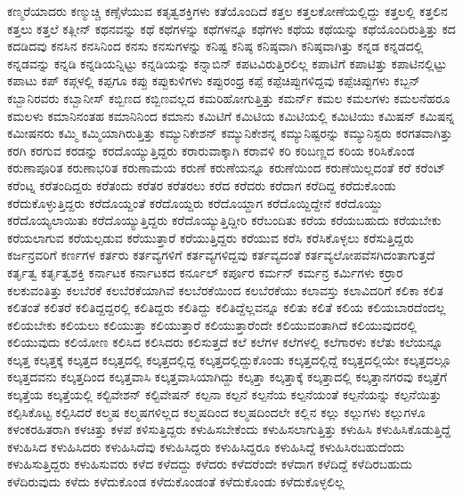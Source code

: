 {ಕಣ್ಮರೆಯಾದರು
ಕಣ್ಮುಚ್ಚಿ
ಕಣ್ಸೆಳೆಯುವ
ಕತೃತ್ವಶಕ್ತಿಗಳು
ಕತೆಯೊಂದಿದೆ
ಕತ್ತಲ
ಕತ್ತಲಕೋಣೆಯಲ್ಲಿದ್ದು
ಕತ್ತಲಲ್ಲಿ
ಕತ್ತಲಿನ
ಕತ್ತಲು
ಕತ್ತಲೆ
ಕತ್ಲೀನ್
ಕಥನವನ್ನು
ಕಥೆ
ಕಥೆಗಳನ್ನು
ಕಥೆಗಳನ್ನೂ
ಕಥೆಗಳು
ಕಥೆಯ
ಕಥೆಯನ್ನು
ಕಥೆಯೊಂದಿರುತ್ತಿತ್ತು
ಕದ
ಕದಡಿದವು
ಕನಸಿನ
ಕನಸಿನಿಂದ
ಕನಸು
ಕನಸುಗಳನ್ನು
ಕನಿಷ್ಟ
ಕನಿಷ್ಠ
ಕನಿಷ್ಠವಾಗಿ
ಕನಿಷ್ಠವಾಗಿತ್ತು
ಕನ್ನಡ
ಕನ್ನಡದಲ್ಲಿ
ಕನ್ನಡವನ್ನು
ಕನ್ನಡಿ
ಕನ್ನಡಿಯನ್ನಿಟ್ಟು
ಕನ್ನಡಿಯನ್ನು
ಕನ್ನಾಬಿನ್
ಕಪಟವಿರುತ್ತಿರಲಿಲ್ಲ
ಕಪಾಟಿಗೆ
ಕಪಾಟಿತ್ತು
ಕಪಾಟಿನಲ್ಲಿಟ್ಟು
ಕಪಾಟು
ಕಪ್
ಕಪ್ಗಳಲ್ಲಿ
ಕಪ್ಪಗೂ
ಕಪ್ಪು
ಕಪ್ಪುಕುಳಿಗಳು
ಕಪ್ಪುರಂಧ್ರ
ಕಪ್ಪೆ
ಕಪ್ಪೆಚಿಪ್ಪುಗಳಿದ್ದವು
ಕಪ್ಪೆಚಿಪ್ಪುಗಳು
ಕಬ್ಬನ್
ಕಬ್ಬಾನಿರವರು
ಕಬ್ಬಾನೀಸ್
ಕಬ್ಬಿಣದ
ಕಬ್ಬಿಣವಲ್ಲದ
ಕಮರಿಹೋಗುತ್ತಿತ್ತು
ಕಮರ್ನ್
ಕಮಲ
ಕಮಲಗಳು
ಕಮಲನೆಹರೂ
ಕಮಲಳು
ಕಮಾನಿನಂತಹ
ಕಮಾನಿನಿಂದ
ಕಮಾನು
ಕಮಿಟಿಗೆ
ಕಮಿಟಿಯ
ಕಮಿಟಿಯಲ್ಲಿ
ಕಮಿಟಿಯು
ಕಮಿಷನ್
ಕಮಿಷನ್ನ
ಕಮೀಷನರು
ಕಮ್ಮಿ
ಕಮ್ಮಿಯಾಗಿರುತ್ತಿತ್ತು
ಕಮ್ಯುನಿಕೇಶನ್
ಕಮ್ಯುನಿಕೇಶನ್ನ
ಕಮ್ಯುನಿಷ್ಟರನ್ನು
ಕಮ್ಯುನಿಸ್ಟರು
ಕರಗತವಾಗಿತ್ತು
ಕರಗಿ
ಕರಗುವ
ಕರಡನ್ನು
ಕರದೊಯ್ಯುತ್ತಿದ್ದರು
ಕರಾರುವಾಕ್ಕಾಗಿ
ಕರಾವಳಿ
ಕರಿ
ಕರಿಬಣ್ಣದ
ಕರಿಯ
ಕರಿಸಿಕೊಂಡ
ಕರುಣಾಪೂರಿತ
ಕರುಣಾಭರಿತ
ಕರುಣಾಮಯ
ಕರುಣೆ
ಕರುಣೆಯನ್ನೂ
ಕರುಣೆಯಿಂದ
ಕರುಣೆಯಿಲ್ಲದಂತೆ
ಕರೆ
ಕರೆಂಟ್
ಕರೆಂಟ್ನ
ಕರೆತಂದಿದ್ದರು
ಕರೆತಂದು
ಕರೆತರ
ಕರೆತರಲು
ಕರೆದ
ಕರೆದರು
ಕರೆದಾಗ
ಕರೆದಿದ್ದ
ಕರೆದುಕೊಂಡು
ಕರೆದುಕೊಳ್ಳುತ್ತಿದ್ದರು
ಕರೆದೊಯ್ದಂತೆ
ಕರೆದೊಯ್ದರು
ಕರೆದೊಯ್ದಾಗ
ಕರೆದೊಯ್ದಿದ್ದೇನೆ
ಕರೆದೊಯ್ದು
ಕರೆದೊಯ್ಯಲಾಯಿತು
ಕರೆದೊಯ್ಯುತ್ತಿದ್ದರು
ಕರೆದೊಯ್ಯುತ್ತಿದ್ದೀರಿ
ಕರೆಬಂದಿತು
ಕರೆಯ
ಕರೆಯಬಹುದು
ಕರೆಯಬೇಕು
ಕರೆಯಲಾಗುವ
ಕರೆಯಲ್ಪಡುವ
ಕರೆಯುತ್ತಾರೆ
ಕರೆಯುತ್ತಿದ್ದರು
ಕರೆಯುವ
ಕರೆಸಿ
ಕರೆಸಿಕೊಳ್ಳಲು
ಕರೆಸುತ್ತಿದ್ದರು
ಕರ್ಜನ್ರವರಿಗೆ
ಕರ್ಣಗಳ
ಕರ್ತರು
ಕರ್ತವ್ಯಗಳಿಗೆ
ಕರ್ತವ್ಯಗಳಿದ್ದವು
ಕರ್ತವ್ಯದಂತೆ
ಕರ್ತವ್ಯಲೋಪವೆಸಗಿದಂತಾಗುತ್ತದೆ
ಕರ್ತೃತ್ವ
ಕರ್ತೃತ್ವಶಕ್ತಿ
ಕರ್ನಾಟಕ
ಕರ್ನಾಟಕದ
ಕರ್ನೂಲ್
ಕರ್ಪೂರ
ಕರ್ಮನ್
ಕರ್ಮನ್ರ
ಕರ್ಮಿಗಳು
ಕರ್ರಾರ
ಕಲಕುವಂತಿತ್ತು
ಕಲಬೆರಕೆ
ಕಲಬೆರಕೆಯಾಗಿವೆ
ಕಲಬೆರಕೆಯಿಂದ
ಕಲಬೆರಕೆಯು
ಕಲಾವಸ್ತು
ಕಲಾವಿದರಿಗೆ
ಕಲಿಕಾ
ಕಲಿತ
ಕಲಿತಂತೆ
ಕಲಿತರೆ
ಕಲಿತಿದ್ದದ್ದರಲ್ಲಿ
ಕಲಿತಿದ್ದರು
ಕಲಿತಿದ್ದು
ಕಲಿತಿದ್ದೆಲ್ಲವನ್ನೂ
ಕಲಿತು
ಕಲಿತೆ
ಕಲಿಯ
ಕಲಿಯಬಾರದೆಂದಲ್ಲ
ಕಲಿಯಬೇಕು
ಕಲಿಯಲು
ಕಲಿಯುತ್ತಾ
ಕಲಿಯುತ್ತಾರೆ
ಕಲಿಯುತ್ತಾರೆಂದೇ
ಕಲಿಯುವಂತಾಗಿದೆ
ಕಲಿಯುವುದರಲ್ಲಿ
ಕಲಿಯುವುದು
ಕಲಿಯೋಣ
ಕಲಿಸಿದ
ಕಲಿಸಿದರು
ಕಲಿಸುತ್ತದೆ
ಕಲೆ
ಕಲೆಗಳ
ಕಲೆಗಳಲ್ಲಿ
ಕಲೆಗಾರಳು
ಕಲೆತು
ಕಲೆಯನ್ನೂ
ಕಲ್ಕತ್ತ
ಕಲ್ಕತ್ತಕ್ಕೆ
ಕಲ್ಕತ್ತದ
ಕಲ್ಕತ್ತದಲ್ಲಿ
ಕಲ್ಕತ್ತದಲ್ಲಿದ್ದ
ಕಲ್ಕತ್ತದಲ್ಲಿದ್ದುಕೊಂಡು
ಕಲ್ಕತ್ತದಲ್ಲಿದ್ದೆ
ಕಲ್ಕತ್ತದಲ್ಲಿಯೇ
ಕಲ್ಕತ್ತದಲ್ಲೂ
ಕಲ್ಕತ್ತದವನು
ಕಲ್ಕತ್ತದಿಂದ
ಕಲ್ಕತ್ತವಾಸಿ
ಕಲ್ಕತ್ತವಾಸಿಯಾಗಿದ್ದು
ಕಲ್ಕತ್ತಾ
ಕಲ್ಕತ್ತಾಕ್ಕೆ
ಕಲ್ಕತ್ತಾದಲ್ಲಿ
ಕಲ್ಕತ್ತಾನಗರವು
ಕಲ್ಕತ್ತೆಗೆ
ಕಲ್ಕತ್ತೆಯ
ಕಲ್ಕತ್ತೆಯಲ್ಲಿ
ಕಲ್ಟಿವೇಶನ್
ಕಲ್ಟಿವೇಷನ್
ಕಲ್ಪನಾ
ಕಲ್ಪನೆ
ಕಲ್ಪನೆಯ
ಕಲ್ಪನೆಯಂತೆ
ಕಲ್ಪನೆಯನ್ನು
ಕಲ್ಪನೆಯಿತ್ತು
ಕಲ್ಪಿಸಿಕೊಟ್ಟ
ಕಲ್ಪಿಸಿದರೆ
ಕಲ್ಮಷ
ಕಲ್ಮಷಗಳಿಲ್ಲದ
ಕಲ್ಮಷದಿಂದ
ಕಲ್ಮಷದಿಂದಲೇ
ಕಲ್ಲಿನ
ಕಲ್ಲು
ಕಲ್ಲುಗಳು
ಕಲ್ಲುಗಳೂ
ಕಳಂಕರಹಿತರಾಗಿ
ಕಳಚಿತ್ತು
ಕಳಪೆ
ಕಳಿಸುತ್ತಿದ್ದರು
ಕಳುಹಿಸಬೇಕೆಂದು
ಕಳುಹಿಸಲಾಗುತ್ತಿತ್ತು
ಕಳುಹಿಸಿ
ಕಳುಹಿಸಿಕೊಡುತ್ತಿದ್ದೆ
ಕಳುಹಿಸಿದ
ಕಳುಹಿಸಿದರು
ಕಳುಹಿಸಿದೆವು
ಕಳುಹಿಸಿದ್ದರು
ಕಳುಹಿಸಿದ್ದರೂ
ಕಳುಹಿಸಿದ್ದೆ
ಕಳುಹಿಸಿರಬಹುದೆಂದು
ಕಳುಹಿಸುತ್ತಿದ್ದರು
ಕಳುಹಿಸುವರು
ಕಳೆದ
ಕಳೆದದ್ದು
ಕಳೆದರು
ಕಳೆದರೆಂದೇ
ಕಳೆದಾಗ
ಕಳೆದಿದ್ದೆ
ಕಳೆದಿರಬಹುದು
ಕಳೆದಿರುವುದು
ಕಳೆದು
ಕಳೆದುಕೊಂಡ
ಕಳೆದುಕೊಂಡಂತೆ
ಕಳೆದುಕೊಂಡು
ಕಳೆದುಕೊಳ್ಳಲಿಲ್ಲ
}
